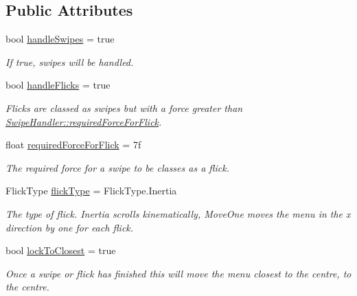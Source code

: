 \subsection*{Public Attributes}
\begin{DoxyCompactItemize}
\item 
bool \hyperlink{class_swipe_menu_1_1_swipe_handler_af579c25de4671de28c630a531d2b66d2}{handle\+Swipes} = true
\begin{DoxyCompactList}\small\item\em If true, swipes will be handled. \end{DoxyCompactList}\item 
bool \hyperlink{class_swipe_menu_1_1_swipe_handler_a4a407fcf9a1bb1ac38ea8ea928b7345d}{handle\+Flicks} = true
\begin{DoxyCompactList}\small\item\em Flicks are classed as swipes but with a force greater than \hyperlink{class_swipe_menu_1_1_swipe_handler_a94ba3d86d8da6741e1c01c135c72b54e}{Swipe\+Handler\+::required\+Force\+For\+Flick}. \end{DoxyCompactList}\item 
float \hyperlink{class_swipe_menu_1_1_swipe_handler_a94ba3d86d8da6741e1c01c135c72b54e}{required\+Force\+For\+Flick} = 7f
\begin{DoxyCompactList}\small\item\em The required force for a swipe to be classes as a flick. \end{DoxyCompactList}\item 
Flick\+Type \hyperlink{class_swipe_menu_1_1_swipe_handler_a002d09a2ce5651f88b4d75b074a3046f}{flick\+Type} = Flick\+Type.\+Inertia
\begin{DoxyCompactList}\small\item\em The type of flick. Inertia scrolls kinematically, Move\+One moves the menu in the x direction by one for each flick. \end{DoxyCompactList}\item 
bool \hyperlink{class_swipe_menu_1_1_swipe_handler_a7a532e6e4e29fc08b51a8dd839c197c0}{lock\+To\+Closest} = true
\begin{DoxyCompactList}\small\item\em Once a swipe or flick has finished this will move the menu closest to the centre, to the centre. \end{DoxyCompactList}\end{DoxyCompactItemize}

